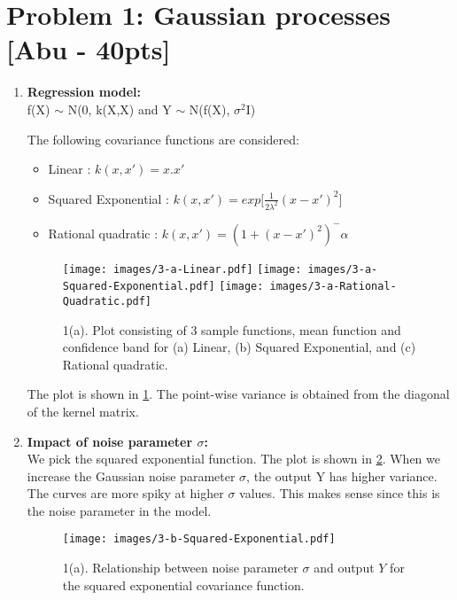 \section*{Problem 1: Gaussian processes [Abu - 40pts]}

\begin{enumerate}

	\item{
	\textbf{Regression model:}\\
	
	\vspace{0.2in}		
	f(X) $\sim$ N(0, k(X,X) and Y $\sim$ N(f(X), $\sigma^2$I)

	The following covariance functions are considered:
	\begin{itemize}
	\item{Linear : $k(x,x') = x.x'$}
	\item{Squared Exponential : $k(x,x') = exp[\frac{1}{2\lambda^2}(x-x')^2$] }
	\item{Rational quadratic : $k(x,x') = (1 + (x-x')^2)^-\alpha$}	
	\end{itemize}

	\begin{figure}[h!]
	\centering
	\texttt{[image: images/3-a-Linear.pdf]}
	\hfill
	\texttt{[image: images/3-a-Squared-Exponential.pdf]}
	\hfill
	\texttt{[image: images/3-a-Rational-Quadratic.pdf]}
	\caption{1(a). Plot consisting of 3 sample functions, mean function and confidence band for (a) Linear, (b) Squared Exponential, and (c) Rational quadratic.}
	\label{fig:1a}
	\end{figure}	
	
	The plot is shown in \cref{fig:1a}. The point-wise variance is obtained from the diagonal of the kernel matrix.					
	}
	
	\item{	
	\textbf{Impact of noise parameter $\sigma$:}\\
	
	We pick the 	squared exponential function. The plot is shown in \cref{fig:1b}.  When we increase the Gaussian noise parameter $\sigma$, the output Y has higher variance. The curves are more spiky at higher $\sigma$ values. This makes sense since this is the noise parameter in the model.
	
	\begin{figure}[h!]
	\centering
	\texttt{[image: images/3-b-Squared-Exponential.pdf]}
	\caption{1(a). Relationship between noise parameter $\sigma$ and output $Y$ for the squared exponential covariance function.}
	\label{fig:1b}
	\end{figure}		
	}	


\end{enumerate}
